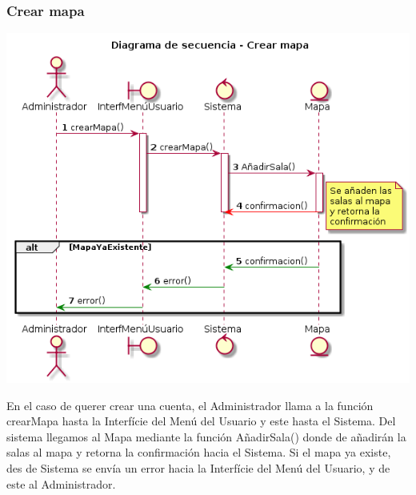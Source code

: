 \subsubsection{Crear mapa}
\begin{center}
  \includegraphics[width=1\textwidth]{./imatges/administrador/Crear_mapa.png}
  \end{center}
  En el caso de querer crear una cuenta, el Administrador llama a la función crearMapa hasta la Interfície del Menú del Usuario y este hasta el Sistema. Del sistema llegamos al Mapa mediante la función AñadirSala() donde de añadirán la salas al mapa y retorna la confirmación hacia el Sistema. Si el mapa ya existe, des de Sistema se envía un error hacia la Interfície del Menú del Usuario, y de este al Administrador.
  
